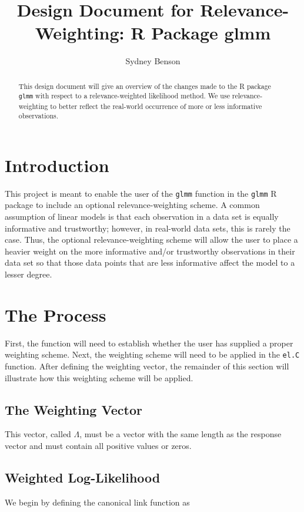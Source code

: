 \documentclass{article}
\title{Design Document for Relevance-Weighting: R Package glmm}
\author{Sydney Benson}
\begin{document}
\maketitle{}

\begin{abstract}
This design document will give an overview of the changes made to the R package \texttt{glmm} with respect to a relevance-weighted likelihood method. We use relevance-weighting to better reflect the real-world occurrence of more or less informative observations.
\end{abstract}

\section{Introduction}
This project is meant to enable the user of the \texttt{glmm} function in the \texttt{glmm} R package to include an optional relevance-weighting scheme. A common assumption of linear models is that each observation in a data set is equally informative and trustworthy; however, in real-world data sets, this is rarely the case. Thus, the optional relevance-weighting scheme will allow the user to place a heavier weight on the more informative and/or trustworthy observations in their data set so that those data points that are less informative affect the model to a lesser degree.

\section{The Process}
First, the function will need to establish whether the user has supplied a proper weighting scheme. Next, the weighting scheme will need to be applied in the \texttt{el.C} function. After defining the weighting vector, the remainder of this section will illustrate how this weighting scheme will be applied. 

\subsection{The Weighting Vector}
This vector, called $\Lambda$, must be a vector with the same length as the response vector and must contain all positive values or zeros. 

\subsection{Weighted Log-Likelihood}
We begin by defining the canonical link function as 
\end{document}
